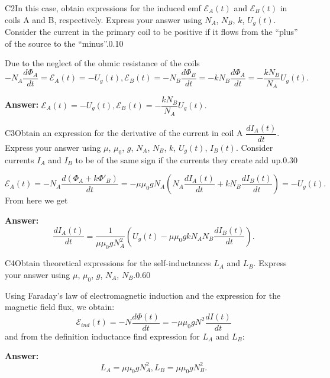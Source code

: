 \documentclass[11pt,a4paper]{article}
\begin{document}
\begin{solcard}{C2}{In this case, obtain expressions for the induced emf $\mathcal{E}_A(t)$ and $\mathcal{E}_B(t)$ in coils A and B, respectively. Express your answer using $N_A$, $N_B$, $k$, $U_g(t)$. Consider the current in the primary coil to be positive if it flows from the “plus” of the source to the “minus”.}{0.10}

Due to the neglect of the ohmic resistance of the coils $$-N_A\dfrac{d\Phi_A}{dt}=\mathcal{E}_A(t)=-U_g(t),\mathcal{E}_B(t)=-N_B\dfrac{d\Phi_B}{dt}=-kN_B\dfrac{d\Phi_A}{dt}=-\dfrac{kN_B}{N_A}U_g(t).$$

\par\smallskip\noindent\textbf{Answer:} $\mathcal{E}_A(t)=-U_g(t),\mathcal{E}_B(t)=-\dfrac{kN_B}{N_A}U_g(t).$
\end{solcard}

\begin{solcard}{C3}{Obtain an expression for the derivative of the current in coil A $\dfrac{dI_A(t)}{dt}$. Express your answer using $\mu$, $\mu_0$, $g$, $N_A$, $N_B$, $k$, $U_g(t)$, $I_B(t)$. Consider currents $I_A$ and $I_B$ to be of the same sign if the currents they create add up.}{0.30}

$$\mathcal{E}_A(t)=-N_A\dfrac{d(\Phi_A+k\Phi'_B)}{dt}=-\mu\mu_0gN_A\left(N_A\dfrac{dI_A(t)}{dt}+kN_B\dfrac{dI_B(t)}{dt}\right)=-U_g(t).$$From here we get

\par\smallskip\noindent\textbf{Answer:} $$\dfrac{dI_A(t)}{dt}=\dfrac{1}{\mu\mu_0gN^2_A}\left(U_g(t)-\mu\mu_0gkN_AN_B\dfrac{dI_B(t)}{dt}\right).$$
\end{solcard}

\begin{solcard}{C4}{Obtain theoretical expressions for the self-inductances $L_A$ and $L_B$. Express your answer using $\mu$, $\mu_0$, $g$, $N_A$, $N_B$.}{0.60}

Using Faraday's law of electromagnetic induction and the expression for the magnetic field flux, we obtain: $$\mathcal{E}_{ind}(t)=-N\dfrac{d\Phi(t)}{dt}=-\mu\mu_0gN^2\dfrac{dI(t)}{dt}$$and from the definition inductance find expression for $L_A$ and $L_B$:

\par\smallskip\noindent\textbf{Answer:} $$L_A=\mu\mu_0gN^2_A,L_B=\mu\mu_0gN^2_B.$$
\end{solcard}
\end{document}
